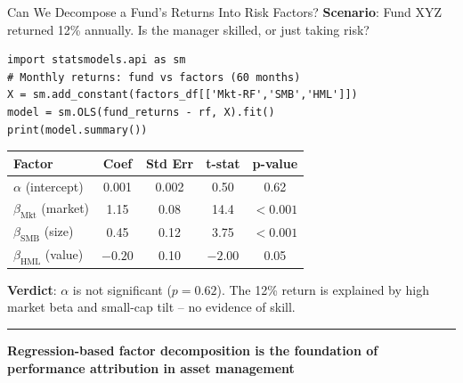 \documentclass[8pt,aspectratio=169]{beamer}
\newcommand{\bottomnote}[1]{%
\vfill
\vspace{-2mm}
\textcolor{mllavender2}{\rule{\textwidth}{0.4pt}}
\vspace{1mm}
\footnotesize
\textbf{#1}
}
\newcommand{\highlight}[1]{\textcolor{mlorange}{\textbf{#1}}}
\begin{document}
\begin{frame}[fragile]{Can We Decompose a Fund's Returns Into Risk Factors?}
\small
\textbf{Scenario}: Fund XYZ returned 12\% annually. Is the manager skilled, or just taking risk?

\vspace{2mm}
\begin{verbatim}
import statsmodels.api as sm
# Monthly returns: fund vs factors (60 months)
X = sm.add_constant(factors_df[['Mkt-RF','SMB','HML']])
model = sm.OLS(fund_returns - rf, X).fit()
print(model.summary())
\end{verbatim}

\vspace{1mm}
\footnotesize
\begin{tabular}{lcccc}
\toprule
\textbf{Factor} & \textbf{Coef} & \textbf{Std Err} & \textbf{t-stat} & \textbf{p-value} \\
\midrule
$\alpha$ (intercept) & 0.001 & 0.002 & 0.50 & 0.62 \\
$\beta_{\text{Mkt}}$ (market) & 1.15 & 0.08 & 14.4 & $< 0.001$ \\
$\beta_{\text{SMB}}$ (size) & 0.45 & 0.12 & 3.75 & $< 0.001$ \\
$\beta_{\text{HML}}$ (value) & $-0.20$ & 0.10 & $-2.00$ & 0.05 \\
\bottomrule
\end{tabular}

\vspace{2mm}
\highlight{Verdict}: $\alpha$ is not significant ($p = 0.62$). The 12\% return is explained by high market beta and small-cap tilt -- no evidence of skill.

\bottomnote{Regression-based factor decomposition is the foundation of performance attribution in asset management}
\end{frame}
\end{document}
